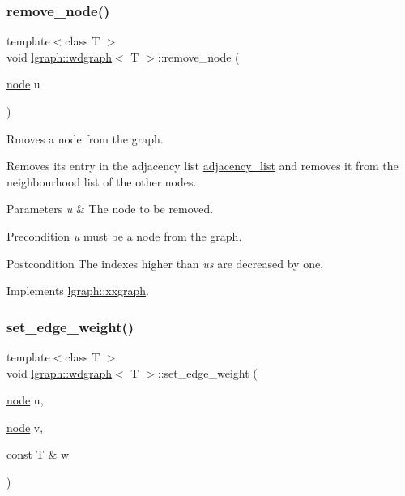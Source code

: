 \subsubsection{\texorpdfstring{remove\+\_\+node()}{remove\_node()}}
{\footnotesize\ttfamily template$<$class T $>$ \\
void \hyperlink{classlgraph_1_1wdgraph}{lgraph\+::wdgraph}$<$ T $>$\+::remove\+\_\+node (\begin{DoxyParamCaption}\item[{\hyperlink{namespacelgraph_a397169dd66adf725210a30fb7251773e}{node}}]{u }\end{DoxyParamCaption})\hspace{0.3cm}{\ttfamily [virtual]}}



Rmoves a node from the graph. 

Removes its entry in the adjacency list \hyperlink{classlgraph_1_1xxgraph_a31cf82d0b20be05290be259dc97a51ec}{adjacency\+\_\+list} and removes it from the neighbourhood list of the other nodes.


\begin{DoxyParams}{Parameters}
{\em u} & The node to be removed. \\
\hline
\end{DoxyParams}
\begin{DoxyPrecond}{Precondition}
{\itshape u} must be a node from the graph. 
\end{DoxyPrecond}
\begin{DoxyPostcond}{Postcondition}
The indexes higher than {\itshape u\textquotesingle{}s} are decreased by one. 
\end{DoxyPostcond}


Implements \hyperlink{classlgraph_1_1xxgraph_a5b9e033f38a3ab34734be61aa9344c84}{lgraph\+::xxgraph}.

\mbox{\label{classlgraph_1_1wdgraph_a4bc95cc58a1f0d735c1317611f516969}} 
\subsubsection{\texorpdfstring{set\+\_\+edge\+\_\+weight()}{set\_edge\_weight()}\hspace{0.1cm}{\footnotesize\ttfamily [1/2]}}
{\footnotesize\ttfamily template$<$class T $>$ \\
void \hyperlink{classlgraph_1_1wdgraph}{lgraph\+::wdgraph}$<$ T $>$\+::set\+\_\+edge\+\_\+weight (\begin{DoxyParamCaption}\item[{\hyperlink{namespacelgraph_a397169dd66adf725210a30fb7251773e}{node}}]{u,  }\item[{\hyperlink{namespacelgraph_a397169dd66adf725210a30fb7251773e}{node}}]{v,  }\item[{const T \&}]{w }\end{DoxyParamCaption})\hspace{0.3cm}{\ttfamily [virtual]}}



